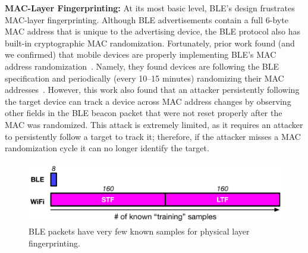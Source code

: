 \vspace{0.5em}
\noindent\textbf{MAC-Layer Fingerprinting:} 
%
At its most basic level, BLE's design frustrates MAC-layer fingerprinting.
%
Although BLE advertisements contain a full 6-byte MAC address that is unique to the
advertising device, the BLE protocol also has built-in cryptographic MAC randomization.
%
Fortunately, prior work found (and we confirmed) that mobile devices are
properly implementing BLE's MAC address randomization~\cite{Iphonetracking_becker,MACRandomizationfail_Martin}.
%
Namely, they found devices are following the BLE specification and periodically
(every 10--15 minutes) randomizing their MAC addresses~\cite{BTsigprivacy}.
%
However, this work also found that an attacker persistently following the target
device can track a device across MAC address changes by observing other fields
in the BLE beacon packet that were not reset properly after the MAC was
randomized.
%
This attack is extremely limited, as it requires an attacker to
persistently follow a target to track it; therefore, if the attacker misses a
MAC randomization cycle it can no longer identify the target.

\begin{figure}
    \centering
    \includegraphics[width=\linewidth]{plots/knownsamples}
    \caption{
      BLE packets have very few known samples for physical layer fingerprinting.
    \label{fig:2}
  }
\end{figure}



